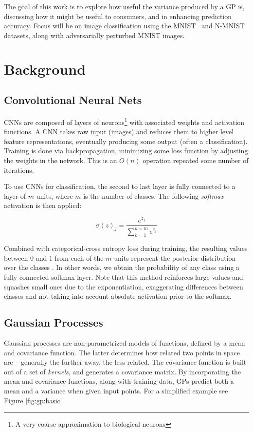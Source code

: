 \documentclass{article}
\begin{document}
The goal of this work is to explore how useful the variance produced by a GP is, discussing how it might be useful to consumers, and in enhancing prediction accuracy. Focus will be on image classification using the MNIST~\cite{lecun1998gradient} and N-MNIST~\cite{basu2017learning} datasets, along with adversarially perturbed MNIST images.


\section{Background}
\label{sec:background}
\subsection{Convolutional Neural Nets}
\label{sec:background:cnn}
CNNs are composed of layers of neurons\footnote{A very coarse approximation to biological neurons} with associated weights and activation functions. A CNN takes raw input (images) and reduces them to higher level feature representations, eventually producing some output (often a classification). Training is done via backpropagation, minimizing some loss function by adjusting the weights in the network. This is an $O(n)$ operation repeated some number of iterations.

To use CNNs for classification, the second to last layer is fully connected to a layer of $m$ units, where $m$ is the number of classes. The following \textit{softmax} activation is then applied:

\[ \sigma(z)_j = \frac{e^{z_j}}{\sum_{k=1}^{k=m}e^{z_j}} \]

Combined with categorical-cross entropy loss during training, the resulting values between 0 and 1 from each of the $m$ units represent the posterior distribution over the classes \cite{bridle1990probabilistic}. In other words, we obtain the probability of any class using a fully connected softmax layer. Note that this method reinforces large values and squashes small ones due to the exponentiation, exaggerating differences between classes and not taking into account absolute activation prior to the softmax.

\subsection{Gaussian Processes}
\label{sec:background:gp}
Gaussian processes are non-parametrized models of functions, defined by a mean and covariance function. The latter determines how related two points in space are -- generally the further away, the less related. The covariance function is built out of a set of \textit{kernels}, and generates a covariance matrix. By incorporating the mean and covariance functions, along with training data, GPs predict both a mean and a variance when given input points. For a simplified example see Figure \ref{fig:gp:basic}.
\end{document}
